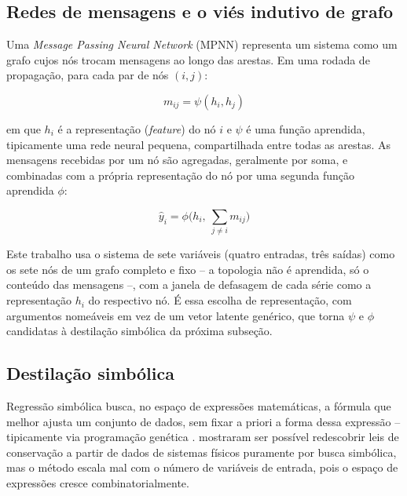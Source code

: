 \documentclass[
	article,		%
	12pt,			%
	oneside,
	a4paper,
	brazil
]{abntex2}
\begin{document}
\subsection{Redes de mensagens e o viés indutivo de grafo}

Uma \textit{Message Passing Neural Network} (MPNN) \cite{gilmer2017}
representa um sistema como um grafo cujos nós trocam mensagens ao longo das
arestas. Em uma rodada de propagação, para cada par de nós $(i, j)$:

\begin{equation}
	m_{ij} = \psi(h_i, h_j)
	\label{eq:mensagem}
\end{equation}

em que $h_i$ é a representação (\textit{feature}) do nó $i$ e $\psi$ é uma
função aprendida, tipicamente uma rede neural pequena, compartilhada entre
todas as arestas. As mensagens recebidas por um nó são agregadas, geralmente
por soma, e combinadas com a própria representação do nó por uma segunda
função aprendida $\phi$:

\begin{equation}
	\hat y_i = \phi\Big(h_i,\ \textstyle\sum_{j \neq i} m_{ij}\Big)
	\label{eq:atualizacao}
\end{equation}

Este trabalho usa o sistema de sete variáveis (quatro entradas, três
saídas) como os sete nós de um grafo completo e fixo -- a topologia não é
aprendida, só o conteúdo das mensagens --, com a janela de defasagem de cada
série como a representação $h_i$ do respectivo nó. É essa escolha de
representação, com argumentos nomeáveis em vez de um vetor latente
genérico, que torna $\psi$ e $\phi$ candidatas à destilação simbólica da
próxima subseção.

\subsection{Destilação simbólica}

Regressão simbólica busca, no espaço de expressões matemáticas, a fórmula
que melhor ajusta um conjunto de dados, sem fixar a priori a forma dessa
expressão -- tipicamente via programação genética \cite{koza1992}.
 mostraram ser possível redescobrir leis de
conservação a partir de dados de sistemas físicos puramente por busca
simbólica, mas o método escala mal com o número de variáveis de entrada,
pois o espaço de expressões cresce combinatorialmente.
\end{document}
